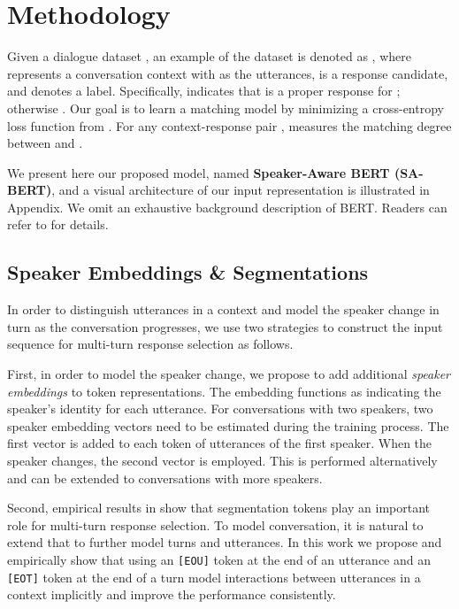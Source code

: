 \documentclass[sigconf]{acmart}
\begin{document}
\section{Methodology}

  Given a dialogue dataset , an example of the dataset is denoted as , where  represents a conversation context with  as the utterances,
   is a response candidate, and  denotes a label.
  Specifically,  indicates that  is a proper response for ; otherwise .
  Our goal is to learn a matching model  by minimizing a cross-entropy loss function from .
  For any context-response pair ,  measures the matching degree between  and .


  We present here our proposed model, named \textbf{Speaker-Aware BERT (SA-BERT)}, and a visual architecture of our input representation is illustrated in Appendix. 
  We omit an exhaustive background description of BERT. 
  Readers can refer to \cite{DBLP:conf/naacl/DevlinCLT19} for details. 

  \subsection{Speaker Embeddings \& Segmentations}



    In order to distinguish utterances in a context and model the speaker change in turn as the conversation progresses, we use two strategies to construct the input sequence for multi-turn response selection as follows.

    First, in order to model the speaker change, we propose to add additional \emph{speaker embeddings} to token representations.
    The embedding functions as indicating the speaker's identity for each utterance. 
    For conversations with two speakers, two speaker embedding vectors need to be estimated during the training process.
    The first vector is added to each token of utterances of the first speaker. 
    When the speaker changes, the second vector is employed.
    This is performed alternatively and can be extended to conversations with more speakers.

    Second, empirical results in \cite{DBLP:journals/corr/abs-1802-02614} show that segmentation tokens play an important role for multi-turn response selection. 
    To model conversation, it is natural to extend that to further model turns and utterances. 
    In this work we propose and  empirically show that using an \texttt{[EOU]} token at the end of an utterance and an \texttt{[EOT]} token at the end of a turn model interactions between utterances in a context implicitly and improve the performance consistently. 
  
\end{document}
